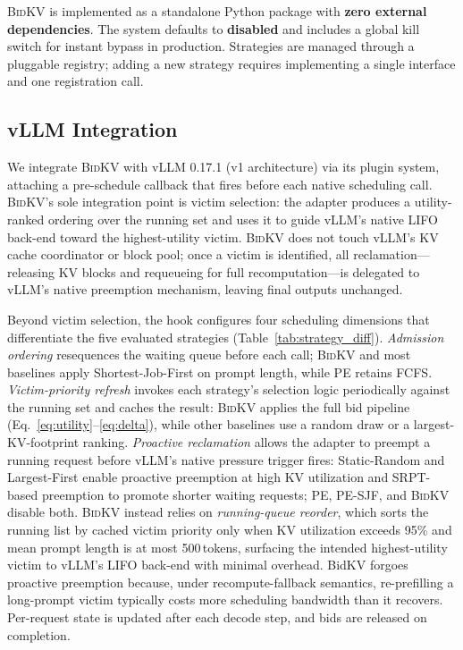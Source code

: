 \documentclass[conference]{IEEEtran}
\newcommand{\bidkv}{\textsc{BidKV}\xspace}
\begin{document}
\bidkv is implemented as a standalone Python package with \textbf{zero external
dependencies}.  The system defaults to \textbf{disabled}
and includes a global kill switch for instant bypass in production.
Strategies are managed through a pluggable registry; adding a new strategy
requires implementing a single interface and one registration call.

\subsection{vLLM Integration}\label{sec:impl:vllm}

We integrate \bidkv with vLLM 0.17.1 (v1 architecture) via its plugin
system, attaching a pre-schedule callback that fires before each native
scheduling call.  \bidkv's sole integration point is victim selection: the
adapter produces a utility-ranked ordering over the running set and uses it
to guide vLLM's native LIFO back-end toward the highest-utility victim.
\bidkv does not touch vLLM's KV cache coordinator or block pool; once a
victim is identified, all reclamation---releasing KV blocks and requeueing
for full recomputation---is delegated to vLLM's native preemption mechanism,
leaving final outputs unchanged.

Beyond victim selection, the hook configures four scheduling dimensions
that differentiate the five evaluated strategies
(Table~\ref{tab:strategy_diff}).
\emph{Admission ordering} resequences the waiting queue before each call;
\bidkv and most baselines apply Shortest-Job-First on prompt length, while
PE retains FCFS.
\emph{Victim-priority refresh} invokes each strategy's selection logic
periodically against the running set and caches the result: \bidkv applies
the full bid pipeline (Eq.~\ref{eq:utility}--\ref{eq:delta}), while other
baselines use a random draw or a largest-KV-footprint ranking.
\emph{Proactive reclamation} allows the adapter to preempt a running request
before vLLM's native pressure trigger fires: Static-Random and Largest-First
enable proactive preemption at high KV utilization and SRPT-based preemption
to promote shorter waiting requests; PE, PE-SJF, and \bidkv disable both.
\bidkv instead relies on \emph{running-queue reorder}, which sorts the
running list by cached victim priority only when KV utilization exceeds 95\%
and mean prompt length is at most 500\,tokens, surfacing the intended
highest-utility victim to vLLM's LIFO back-end with minimal overhead.
BidKV forgoes proactive preemption because, under recompute-fallback
semantics, re-prefilling a long-prompt victim typically costs more scheduling
bandwidth than it recovers.
Per-request state is updated after each decode step, and bids are released
on completion.
\end{document}
